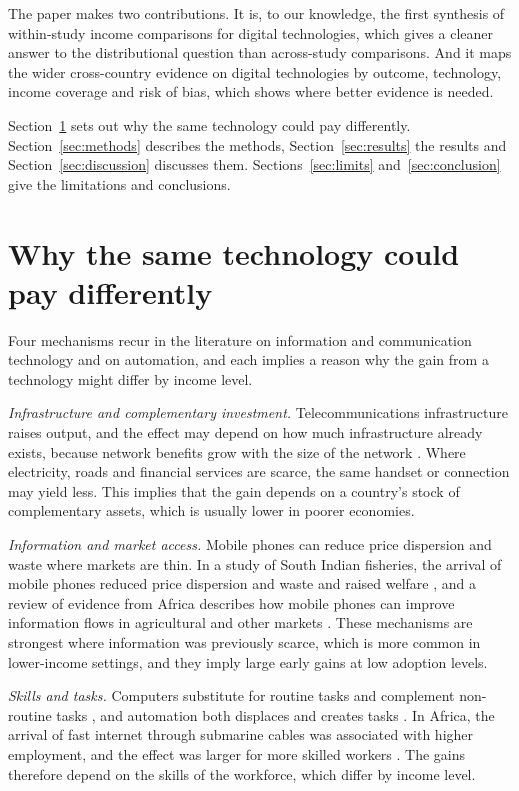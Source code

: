 \documentclass[11pt,a4paper]{article}
\begin{document}
The paper makes two contributions. It is, to our knowledge, the first synthesis of within-study income comparisons for digital technologies, which gives a cleaner answer to the distributional question than across-study comparisons. And it maps the wider cross-country evidence on digital technologies by outcome, technology, income coverage and risk of bias, which shows where better evidence is needed.

Section~\ref{sec:background} sets out why the same technology could pay differently. Section~\ref{sec:methods} describes the methods, Section~\ref{sec:results} the results and Section~\ref{sec:discussion} discusses them. Sections~\ref{sec:limits} and~\ref{sec:conclusion} give the limitations and conclusions.

\section{Why the same technology could pay differently}\label{sec:background}
Four mechanisms recur in the literature on information and communication technology and on automation, and each implies a reason why the gain from a technology might differ by income level.

\emph{Infrastructure and complementary investment.} Telecommunications infrastructure raises output, and the effect may depend on how much infrastructure already exists, because network benefits grow with the size of the network \cite{roller2001}. Where electricity, roads and financial services are scarce, the same handset or connection may yield less. This implies that the gain depends on a country's stock of complementary assets, which is usually lower in poorer economies.

\emph{Information and market access.} Mobile phones can reduce price dispersion and waste where markets are thin. In a study of South Indian fisheries, the arrival of mobile phones reduced price dispersion and waste and raised welfare \cite{jensen2007}, and a review of evidence from Africa describes how mobile phones can improve information flows in agricultural and other markets \cite{aker2010}. These mechanisms are strongest where information was previously scarce, which is more common in lower-income settings, and they imply large early gains at low adoption levels.

\emph{Skills and tasks.} Computers substitute for routine tasks and complement non-routine tasks \cite{autor2003}, and automation both displaces and creates tasks \cite{acemoglu2019}. In Africa, the arrival of fast internet through submarine cables was associated with higher employment, and the effect was larger for more skilled workers \cite{hjort2019}. The gains therefore depend on the skills of the workforce, which differ by income level.
\end{document}
